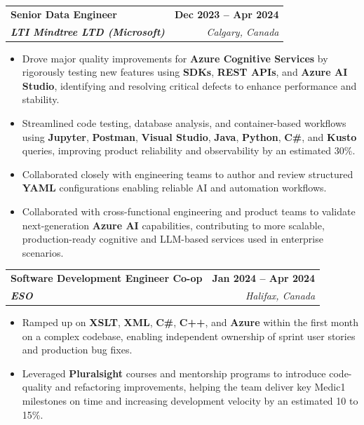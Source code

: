 \documentclass[letterpaper,11pt]{article}
\makeatletter
\newcommand{\resumeItem}[1]{
  \item\small{
    {#1 \vspace{-2pt}}
  }
}
\newcommand{\resumeSubheading}[4]{
  \vspace{-2pt}\item
    \begin{tabular*}{1.0\textwidth}[t]{l@{\extracolsep{\fill}}r}
      \textbf{#1} & \textbf{\small #2} \\
      \textit{\small#3} & \textit{\small #4} \\
    \end{tabular*}\vspace{-7pt}
}
\newcommand{\resumeItemListStart}{\begin{itemize}}
\newcommand{\resumeItemListEnd}{\end{itemize}\vspace{-5pt}}
\makeatother
\begin{document}
    \resumeSubheading
      {Senior Data Engineer}{\textbf{Dec 2023 -- Apr 2024}}
      {\textbf{LTI Mindtree LTD (Microsoft)}}{Calgary, Canada}
      \resumeItemListStart
        \resumeItem{Drove major quality improvements for \textbf{Azure Cognitive Services} by rigorously testing new features using \textbf{SDKs}, \textbf{REST APIs}, and \textbf{Azure AI Studio}, identifying and resolving critical defects to enhance performance and stability.}
        \resumeItem{Streamlined code testing, database analysis, and container-based workflows using \textbf{Jupyter}, \textbf{Postman}, \textbf{Visual Studio}, \textbf{Java}, \textbf{Python}, \textbf{C\#}, and \textbf{Kusto} queries, improving product reliability and observability by an estimated 30\%.}
        \resumeItem{Collaborated closely with engineering teams to author and review structured \textbf{YAML} configurations enabling reliable AI and automation workflows.}
        \resumeItem{Collaborated with cross-functional engineering and product teams to validate next-generation \textbf{Azure AI} capabilities, contributing to more scalable, production-ready cognitive and LLM-based services used in enterprise scenarios.}
      \resumeItemListEnd
    
    \resumeSubheading
      {Software Development Engineer Co-op}{\textbf{Jan 2024 -- Apr 2024}}
      {\textbf{ESO}}{Halifax, Canada}
      \resumeItemListStart
        \resumeItem{Ramped up on \textbf{XSLT}, \textbf{XML}, \textbf{C\#}, \textbf{C++}, and \textbf{Azure} within the first month on a complex codebase, enabling independent ownership of sprint user stories and production bug fixes.}
        \resumeItem{Leveraged \textbf{Pluralsight} courses and mentorship programs to introduce code-quality and refactoring improvements, helping the team deliver key Medic1 milestones on time and increasing development velocity by an estimated 10 to 15\%.}
      \resumeItemListEnd
\end{document}
